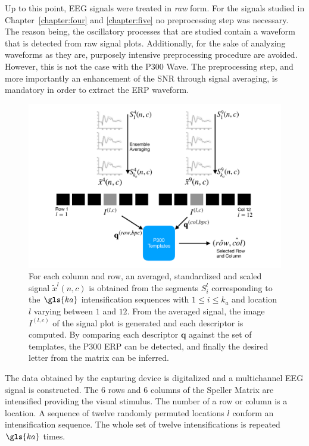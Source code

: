 Up to this point, EEG signals were treated in \textit{raw} form.  For the signals studied in Chapter~\ref{chapter:four} and \ref{chapter:five} no preprocessing step was necessary. The reason being, the oscillatory processes that are studied contain a waveform that is detected from raw signal plots.  Additionally, for the sake of analyzing waveforms as they are, purposely intensive preprocessing procedure are avoided.  However, this is not the case with the P300 Wave.  The preprocessing step, and more importantly an enhancement of the SNR through signal averaging, is mandatory in order to extract the ERP waveform.

\begin{figure}[htb]
\centering
\includegraphics[width=15cm]{images/classificationgraph.pdf}
\caption[P300 Speller Matrix Letter Identification]{For each column and row, an averaged, standardized and scaled signal $\tilde{x}^l(n,c)$ is obtained from the segments $S_i^l$  corresponding to the $\gls{ka}$ intensification sequences with $ 1 \leq i \leq k_a $ and location $l$ varying between $1$ and $12$. From the averaged signal, the image $I^{(l,c)}$ of the signal plot is generated and each descriptor is computed.  By comparing each descriptor $\mathbf{q}$  against the set of templates, the P300 ERP can be detected, and finally the desired letter from the matrix can be inferred.}
\label{fig:classification}
\end{figure}

The data obtained by the capturing device is digitalized and a multichannel EEG signal is constructed. The $6$ rows and $6$ columns of the Speller Matrix are intensified providing the visual stimulus.  The number of a row or column is a location. A sequence of twelve randomly permuted locations $l$ conform an intensification sequence. The whole set of twelve intensifications is repeated $\gls{ka}$ times.

